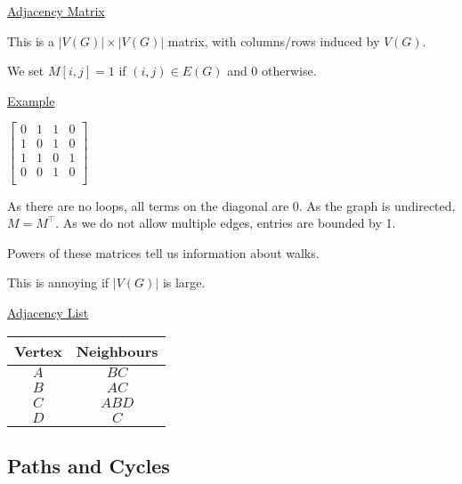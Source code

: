 \documentclass{article}
\begin{document}
\underline{Adjacency Matrix}

This is a $|V(G)| \times |V(G)|$ matrix, with columns/rows induced by $V(G)$.

We set $M[i,j] = 1$ if $(i,j) \in E(G)$ and 0 otherwise.

\underline{Example}

\begin{center}

$\begin{bmatrix}
0 & 1 & 1 & 0\\
1 & 0 & 1 & 0\\
1 & 1 & 0 & 1\\
0 & 0 & 1 & 0\\
\end{bmatrix}$
\end{center}

As there are no loops, all terms on the diagonal are 0. As the graph is undirected, $M = M^\top$. As we do not allow multiple edges, entries are bounded by 1. 

Powers of these matrices tell us information about walks. 

This is annoying if $|V(G)|$ is large. 

\underline{Adjacency List}


\begin{table}[h]
    \centering
    \begin{tabular}{c|c}
        Vertex & Neighbours\\ \hline
         $A$& $BC$\\
         $B$& $AC$\\
         $C$& $ABD$\\
         $D$& $C$\\
    \end{tabular}
\end{table}


\subsection{Paths and Cycles}
\end{document}
